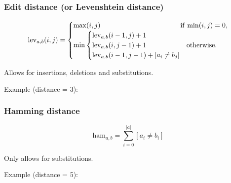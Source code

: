 \documentclass[slidestop]{beamer}
\begin{document}
\begin{frame}
  \frametitle{Edit distance (or Levenshtein distance)}
  \[
    \mathrm{lev}_{a, b}(i, j) =
    \begin{cases}
      \mathrm{max}(i, j) & \hspace{-2.25cm}\mathrm{if\ min}(i, j) = 0,\\
      \mathrm{min}
      \begin{cases}
        \mathrm{lev}_{a, b}(i - 1, j) + 1\\
        \mathrm{lev}_{a, b}(i, j - 1) + 1 & \mathrm{otherwise.}\\
        \mathrm{lev}_{a, b}(i - 1, j - 1) + [a_i \neq b_j]\\
      \end{cases}
    \end{cases}
  \]
  \bigskip

  Allows for insertions, deletions and substitutions.
  \bigskip
  \pause

  Example (distance = 3):
  \begin{center}
  \end{center}
\end{frame}

\begin{frame}
  \frametitle{Hamming distance}
  \[
    \mathrm{ham}_{a, b} = \sum_{i = 0}^{|a|} [a_i \neq b_i]
  \]
  \bigskip

  Only allows for substitutions.
  \bigskip
  \pause

  Example (distance = 5):
  \begin{center}
  \end{center}
\end{frame}
\end{document}
